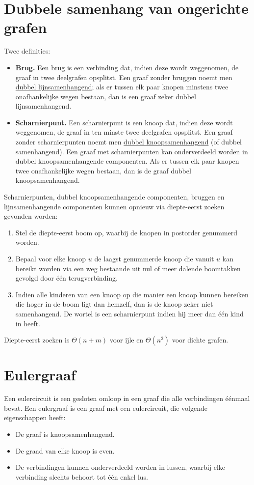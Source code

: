 \documentclass{report}
\begin{document}
\section{Dubbele samenhang van ongerichte grafen}
Twee definities:
\begin{itemize}
	\item \textbf{Brug.} Een brug is een verbinding dat, indien deze wordt weggenomen, de graaf in twee deelgrafen opsplitst. Een graaf zonder bruggen noemt men \underline{dubbel lijnsamenhangend}; als er tussen elk paar knopen minstens twee onafhankelijke wegen bestaan, dan is een graaf zeker dubbel lijnsamenhangend.
	\item \textbf{Scharnierpunt.} Een scharnierpunt is een knoop dat, indien deze wordt weggenomen, de graaf in ten minste twee deelgrafen opsplitst. Een graaf zonder scharnierpunten noemt men \underline{dubbel knoopsamenhangend} (of dubbel samenhangend). Een graaf met scharnierpunten kan onderverdeeld worden in dubbel knoopsamenhangende componenten. Als er tussen elk paar knopen twee onafhankelijke wegen bestaan, dan is de graaf dubbel knoopsamenhangend.
\end{itemize}

Scharnierpunten, dubbel knoopsamenhangende componenten, bruggen en lijnsamenhangende componenten kunnen opnieuw via diepte-eerst zoeken gevonden worden:
\begin{enumerate}
	\item Stel de diepte-eerst boom op, waarbij de knopen in postorder genummerd worden. 
	\item Bepaal voor elke knoop $u$ de laagst genummerde knoop die vanuit $u$ kan bereikt worden via een weg bestaande uit nul of meer dalende boomtakken gevolgd door één terugverbinding. 
	\item Indien alle kinderen van een knoop op die manier een knoop kunnen bereiken die hoger in de boom ligt dan hemzelf, dan is de knoop zeker niet samenhangend. De wortel is een scharnierpunt indien hij meer dan één kind in heeft.
\end{enumerate}
Diepte-eerst zoeken is $\Theta(n + m)$ voor ijle en $\Theta(n^2)$ voor dichte grafen.
\section{Eulergraaf}
Een eulercircuit is een gesloten omloop in een graaf die alle verbindingen éénmaal bevat. Een eulergraaf is een graaf met een eulercircuit, die volgende eigenschappen heeft:
\begin{itemize}
	\item De graaf is knoopsamenhangend.
	\item De graad van elke knoop is even.
	\item De verbindingen kunnen onderverdeeld worden in lussen, waarbij elke verbinding slechts behoort tot één enkel lus.
\end{itemize}
\end{document}
